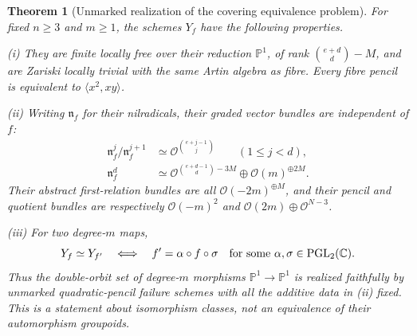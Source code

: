\documentclass[11pt,reqno]{amsart}
\numberwithin{equation}{section}
\newtheorem{theorem}{Theorem}[section]
\theoremstyle{definition}\newtheorem{definition}[theorem]{Definition}
\theoremstyle{remark}\newtheorem{remark}[theorem]{Remark}
\newcommand{\C}{\mathbb C}\newcommand{\Q}{\mathbb Q}
\newcommand{\Pj}{\mathbb P}\newcommand{\A}{\mathbb A}
\newcommand{\OO}{\mathcal O}\newcommand{\II}{\mathcal I}
\begin{document}
\begin{theorem}[Unmarked realization of the covering equivalence problem]
\label{thm:covering-pencil-moduli-v148}
For fixed \(n\ge3\) and \(m\ge1\), the schemes \(Y_f\)
have the following properties.

\smallskip
\noindent (i) They are finite locally free over their reduction
\(\Pj^1\), of rank \(\binom{e+d}{d}-M\), and are
Zariski locally trivial with the same Artin algebra as fibre.
Every fibre pencil is equivalent to \(\langle x^2,xy\rangle\).

\smallskip
\noindent (ii) Writing \(\mathfrak n_f\) for their nilradicals,
their graded vector bundles are independent of \(f\):
\begin{equation}\label{eq:cover-graded-bundles-v148}
 \begin{split}
 \mathfrak n_f^j/\mathfrak n_f^{j+1}
   &\simeq\OO^{\binom{e+j-1}{j}}\qquad(1\le j<d),\\
 \mathfrak n_f^d
   &\simeq\OO^{\binom{e+d-1}{d}-3M}
                              \oplus\OO(m)^{\oplus2M}.
 \end{split}
\end{equation}
Their abstract first-relation bundles are all
\(\OO(-2m)^{\oplus M}\), and their pencil and quotient bundles
are respectively
\(\OO(-m)^2\) and \(\OO(2m)\oplus\OO^{N-3}\).

\smallskip
\noindent (iii) For two degree-\(m\) maps,
\begin{equation}\label{eq:cover-equivalence-v148}
 Y_f\simeq Y_{f'}
 \quad\Longleftrightarrow\quad
 f'=\alpha\circ f\circ\sigma
 \quad\text{for some }\alpha,\sigma\in\PGL_2(\C).
\end{equation}
Thus the double-orbit set of degree-\(m\) morphisms
\(\Pj^1\to\Pj^1\) is realized faithfully by unmarked
quadratic-pencil failure schemes with all the additive data in
(ii) fixed.  This is a statement about isomorphism classes, not an
equivalence of their automorphism groupoids.
\end{theorem}
\end{document}
